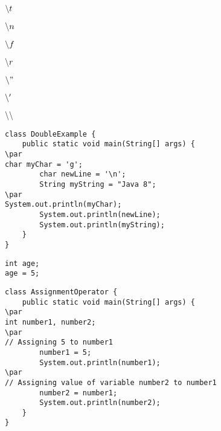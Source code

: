 \documentclass{book}
\def\lthtmlcheckvsize{\ifdim\ht\sizebox<\vsize 
  \ifdim\wd\sizebox<\hsize\expandafter\hfill\fi \expandafter\vfill
  \else\expandafter\vss\fi}%
\begin{document}
{\newpage\clearpage
{}%
$\symbol{92}t$%
\lthtmlindisplaymathZ
\lthtmlcheckvsize\clearpage}

{\newpage\clearpage
{}%
$\symbol{92}n$%
\lthtmlindisplaymathZ
\lthtmlcheckvsize\clearpage}

{\newpage\clearpage
{}%
$\symbol{92}f$%
\lthtmlindisplaymathZ
\lthtmlcheckvsize\clearpage}

{\newpage\clearpage
{}%
$\symbol{92}r$%
\lthtmlindisplaymathZ
\lthtmlcheckvsize\clearpage}

{\newpage\clearpage
{}%
$\symbol{92}"$%
\lthtmlindisplaymathZ
\lthtmlcheckvsize\clearpage}

{\newpage\clearpage
{}%
$\symbol{92}'$%
\lthtmlindisplaymathZ
\lthtmlcheckvsize\clearpage}

{\newpage\clearpage
{}%
$\symbol{92}\symbol{92}$%
\lthtmlindisplaymathZ
\lthtmlcheckvsize\clearpage}

{\newpage\clearpage
{}%
\begin{lstlisting}
class DoubleExample {
    public static void main(String[] args) {
\par
char myChar = 'g';
        char newLine = '\n';
        String myString = "Java 8";
\par
System.out.println(myChar);
        System.out.println(newLine);
        System.out.println(myString);
    }
}
\end{lstlisting}%
\lthtmlfigureZ
\lthtmlcheckvsize\clearpage}

{\newpage\clearpage
{}%
\begin{lstlisting}
int age;
age = 5;
\end{lstlisting}%
\lthtmlfigureZ
\lthtmlcheckvsize\clearpage}

{\newpage\clearpage
{}%
\begin{lstlisting}
class AssignmentOperator {
    public static void main(String[] args) {
\par
int number1, number2;
\par
// Assigning 5 to number1 
        number1 = 5;
        System.out.println(number1);
\par
// Assigning value of variable number2 to number1
        number2 = number1;
        System.out.println(number2);
    }
}
\end{lstlisting}%
\lthtmlfigureZ
\lthtmlcheckvsize\clearpage}
\end{document}
